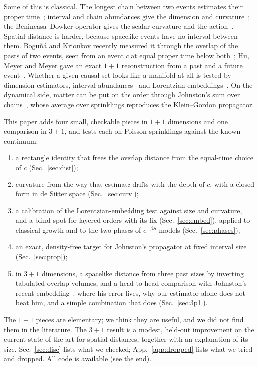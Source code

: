 \documentclass[11pt,a4paper]{article}
\begin{document}
Some of this is classical. The longest chain between two events estimates their proper time~\cite{BrightwellGregory91}; interval and chain abundances give the dimension and curvature~\cite{RSS13,GlaserSurya13}; the Benincasa--Dowker operator gives the scalar curvature and the action~\cite{BD10,DowkerGlaser13}. Spatial distance is harder, because spacelike events have no interval between them. Bogu\~n\'a and Krioukov recently measured it through the overlap of the pasts of two events, seen from an event $c$ at equal proper time below both~\cite{BK24}; Hu, Meyer and Meyer gave an exact $1+1$ reconstruction from a past and a future event~\cite{HMM25}. Whether a given causal set looks like a manifold at all is tested by dimension estimators, interval abundances~\cite{GlaserSurya13} and Lorentzian embeddings~\cite{CloughEvans16,Henson06,Johnston25}. On the dynamical side, matter can be put on the order through Johnston's sum over chains~\cite{Johnston08,Johnston09}, whose average over sprinklings reproduces the Klein--Gordon propagator.

This paper adds four small, checkable pieces in $1+1$ dimensions and one comparison in $3+1$, and tests each on Poisson sprinklings against the known continuum:
\begin{enumerate}[leftmargin=*,itemsep=1pt]
\item a rectangle identity that frees the overlap distance from the equal-time choice of $c$ (Sec.~\ref{sec:dist});
\item curvature from the way that estimate drifts with the depth of $c$, with a closed form in de Sitter space (Sec.~\ref{sec:curv});
\item a calibration of the Lorentzian-embedding test against size and curvature, and a blind spot for layered orders with its fix (Sec.~\ref{sec:embed}), applied to classical growth and to the two phases of $e^{-\beta S}$ models (Sec.~\ref{sec:phases});
\item an exact, density-free target for Johnston's propagator at fixed interval size (Sec.~\ref{sec:prop});
\item in $3+1$ dimensions, a spacelike distance from three past sizes by inverting tabulated overlap volumes, and a head-to-head comparison with Johnston's recent embedding~\cite{Johnston25}: where his error lives, why our estimator alone does not beat him, and a simple combination that does (Sec.~\ref{sec:3p1}).
\end{enumerate}
The $1+1$ pieces are elementary; we think they are useful, and we did not find them in the literature. The $3+1$ result is a modest, held-out improvement on the current state of the art for spatial distances, together with an explanation of its size. Sec.~\ref{sec:disc} lists what we checked; App.~\ref{app:dropped} lists what we tried and dropped. All code is available (see the end).
\end{document}
